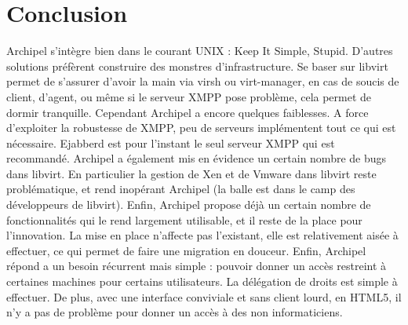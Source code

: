     \section{Conclusion}
Archipel s'intègre bien dans le courant UNIX : Keep It Simple, Stupid. D'autres solutions préfèrent
construire des monstres d'infrastructure. Se baser sur libvirt permet de s'assurer d'avoir la main via virsh
ou virt-manager, en cas de soucis de client, d'agent, ou même si le serveur XMPP pose problème, cela
permet de dormir tranquille.\newline
Cependant Archipel a encore quelques faiblesses. A force d'exploiter la robustesse de XMPP, peu de
serveurs implémentent tout ce qui est nécessaire. Ejabberd est pour l'instant le seul serveur XMPP qui est
recommandé. Archipel a également mis en évidence un certain nombre de bugs dans libvirt. En particulier
la gestion de Xen et de Vmware dans libvirt reste problématique, et rend inopérant Archipel (la balle est
dans le camp des développeurs de libvirt). Enfin, Archipel propose déjà un certain nombre de
fonctionnalités qui le rend largement utilisable, et il reste de la place pour l'innovation.\newline
La mise en place n'affecte pas l'existant, elle est relativement aisée à effectuer, ce qui permet de faire
une migration en douceur.\newline
Enfin, Archipel répond a un besoin récurrent mais simple : pouvoir donner un accès restreint à certaines
machines pour certains utilisateurs. La délégation de droits est simple à effectuer. De plus, avec une
interface conviviale et sans client lourd, en HTML5, il n'y a pas de problème pour donner un accès à des
non informaticiens.

%
%
     
